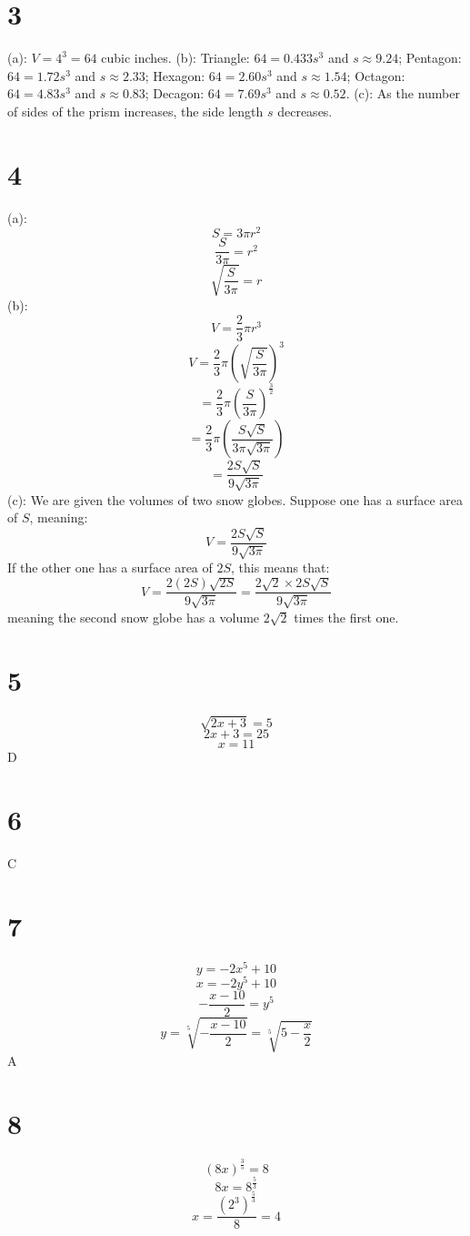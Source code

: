 \documentclass{article}
\theoremstyle{definition}
\newcommand{\?}{\stackrel{?}{=}}
\begin{document}
\section*{3}
(a): $V=4^3=64$ cubic inches.\newline
(b): Triangle: $64=0.433s^3$ and $s\approx 9.24$; Pentagon: $64=1.72s^3$ and $s\approx 2.33$; Hexagon: $64=2.60s^3$ and $s\approx 1.54$; 
Octagon: $64=4.83s^3$ and $s\approx 0.83$; Decagon: $64=7.69s^3$ and $s\approx 0.52$.\newline
(c): As the number of sides of the prism increases, the side length $s$ decreases.

\section*{4}
(a): \[ S=3\pi r^2 \] \[ \frac{S}{3\pi}=r^2 \] \[ \sqrt{\frac{S}{3\pi}}=r \]
(b): \[ V=\frac{2}{3}\pi r^3 \] \[ V=\frac{2}{3}\pi(\sqrt{\frac{S}{3\pi}})^3 \] \[ =\frac{2}{3}\pi (\frac{S}{3\pi})^\frac{3}{2} \]
\[ =\frac{2}{3}\pi\left( \frac{S\sqrt{S}}{3\pi\sqrt{3\pi}} \right) \] \[ =\frac{2S\sqrt{S}}{9\sqrt{3\pi}} \]
(c): We are given the volumes of two snow globes. Suppose one has a surface area of $S$, meaning:
\[ V=\frac{2S\sqrt{S}}{9\sqrt{3\pi}} \] If the other one has a surface area of $2S$, this means that:
\[ V=\frac{2(2S)\sqrt{2S}}{9\sqrt{3\pi}}=\frac{2\sqrt{2}\times 2S\sqrt{S}}{9\sqrt{3\pi}} \] meaning the second snow globe has a volume $2\sqrt{2}$ times 
the first one.

\section*{5}
\[ \sqrt{2x+3}=5 \] \[ 2x+3=25 \] \[ x=11 \] D

\section*{6}
C

\section*{7}
\[ y=-2x^5+10 \] \[ x=-2y^5+10 \] \[ -\frac{x-10}{2}=y^5 \] \[ y=\sqrt[5]{-\frac{x-10}{2}}=\sqrt[5]{5-\frac{x}{2}} \]
A

\section*{8}
\[ (8x)^\frac{3}{5}=8 \] \[ 8x=8^\frac{5}{3} \] \[ x=\frac{(2^3)^\frac{5}{3}}{8}=4 \]
\end{document}
